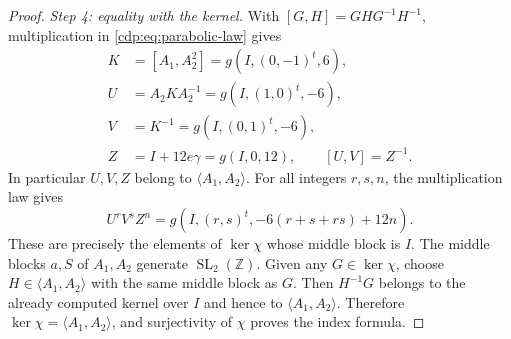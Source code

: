 \begin{proof}
\textit{Step 4: equality with the kernel.}
With $[G,H]=GHG^{-1}H^{-1}$, multiplication in
\eqref{cdp:eq:parabolic-law} gives
\[
 \begin{aligned}
 K&=[A_1,A_2^2]=g(I,(0,-1)^t,6),\\
 U&=A_2KA_2^{-1}=g(I,(1,0)^t,-6),\\
 V&=K^{-1}=g(I,(0,1)^t,-6),\\
 Z&=I+12e\gamma=g(I,0,12),\qquad [U,V]=Z^{-1}.
 \end{aligned}
\]
In particular $U,V,Z$ belong to $\langle A_1,A_2\rangle$. For all
integers $r,s,n$, the multiplication law gives
\[
 U^rV^sZ^n=g(I,(r,s)^t,-6(r+s+rs)+12n).
\]
These are precisely the elements of $\ker\chi$ whose middle block
is $I$. The middle blocks $a,S$ of $A_1,A_2$ generate
$\operatorname{SL}_2(\mathbb Z)$. Given any $G\in\ker\chi$, choose
$H\in\langle A_1,A_2\rangle$ with the same middle block as $G$.
Then $H^{-1}G$ belongs to the already computed kernel over $I$ and
hence to $\langle A_1,A_2\rangle$. Therefore
$\ker\chi=\langle A_1,A_2\rangle$, and surjectivity of $\chi$ proves
the index formula.
\end{proof}
